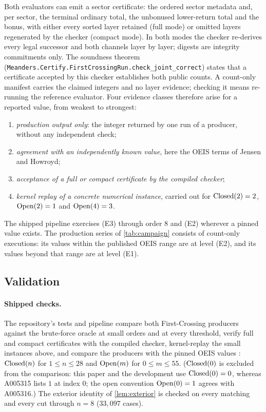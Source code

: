 Both evaluators can emit a sector certificate: the ordered sector metadata
and, per sector, the terminal ordinary total, the unbonused lower-return total
and the bonus, with either every sorted layer retained (full mode) or omitted
layers regenerated by the checker (compact mode). In both modes the checker
re-derives every legal successor and both channels layer by layer; digests are
integrity commitments only. The soundness theorem
(\texttt{Meanders.Certify.FirstCrossingRun.check\_joint\_correct}) states that a
certificate accepted by this checker establishes both public counts. A
count-only manifest carries the claimed integers and no layer evidence;
checking it means re-running the reference evaluator. Four evidence classes
therefore arise for a reported value, from weakest to strongest:
\begin{enumerate}[nosep,label=(E\arabic*)]
\item \emph{production output only}: the integer returned by one run of a
  producer, without any independent check;
\item \emph{agreement with an independently known value}, here the OEIS
  terms of Jensen and Howroyd;
\item \emph{acceptance of a full or compact certificate by the compiled
  checker};
\item \emph{kernel replay of a concrete numerical instance}, carried out
  for $\operatorname{Closed}(2)=2$, $\operatorname{Open}(2)=1$ and $\operatorname{Open}(4)=3$.
\end{enumerate}
The shipped pipeline exercises (E3) through order $8$ and (E2) wherever a
pinned value exists. The production series of \cref{tab:campaign} consists
of count-only executions: its values within the published OEIS range are at
level (E2), and its values beyond that range are at level (E1).

\subsection{Validation}

\paragraph{Shipped checks.} The repository's tests and pipeline compare both
First-Crossing producers against the brute-force oracle at small orders and
at every threshold, verify full and compact certificates with the compiled
checker, kernel-replay the small instances above, and compare the producers
with the pinned OEIS values \cite{OEIS_A005315,OEIS_A005316}: $\operatorname{Closed}(n)$
for $1\le n\le28$ and $\operatorname{Open}(m)$ for $0\le m\le55$. ($\operatorname{Closed}(0)$ is
excluded from the comparison: this paper and the development use
$\operatorname{Closed}(0)=0$, whereas A005315 lists $1$ at index $0$; the open
convention $\operatorname{Open}(0)=1$ agrees with A005316.) The exterior identity of
\cref{lem:exterior} is checked on every matching and every cut through
$n=8$ ($33{,}097$ cases).

